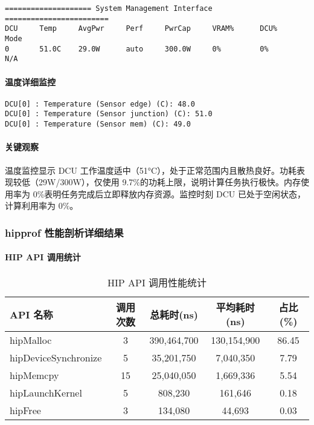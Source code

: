 \documentclass[a4paper]{article}
\begin{document}
\begin{verbatim}
==================== System Management Interface ========================
DCU     Temp     AvgPwr     Perf     PwrCap     VRAM%      DCU%      Mode
0       51.0C    29.0W      auto     300.0W     0%         0%        N/A
\end{verbatim}

\paragraph{温度详细监控}

\begin{verbatim}
DCU[0] : Temperature (Sensor edge) (C): 48.0
DCU[0] : Temperature (Sensor junction) (C): 51.0
DCU[0] : Temperature (Sensor mem) (C): 49.0
\end{verbatim}

\paragraph{关键观察}

温度监控显示 DCU 工作温度适中（51°C），处于正常范围内且散热良好。功耗表现较低（29W/300W），仅使用 9.7\%的功耗上限，说明计算任务执行极快。内存使用率为 0\%表明任务完成后立即释放内存资源。监控时刻 DCU 已处于空闲状态，计算利用率为 0\%。

\subsubsection{hipprof 性能剖析详细结果}

\paragraph{HIP API 调用统计}

\begin{table}[h]
\centering
\begin{tabular}{@{}lcccc@{}}
\toprule
API 名称 & 调用次数 & 总耗时(ns) & 平均耗时(ns) & 占比(\%) \\
\midrule
hipMalloc & 3 & 390,464,700 & 130,154,900 & 86.45 \\
hipDeviceSynchronize & 5 & 35,201,750 & 7,040,350 & 7.79 \\
hipMemcpy & 15 & 25,040,050 & 1,669,336 & 5.54 \\
hipLaunchKernel & 5 & 808,230 & 161,646 & 0.18 \\
hipFree & 3 & 134,080 & 44,693 & 0.03 \\
\bottomrule
\end{tabular}
\caption{HIP API 调用性能统计}
\end{table}
\end{document}
